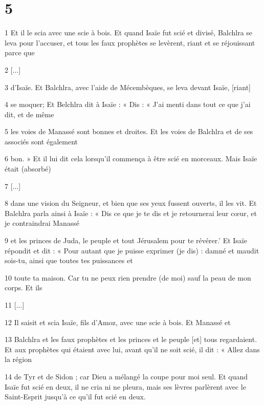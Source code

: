 \chapter{5}

\par 1 Et il le scia avec une scie à bois. Et quand Isaïe fut scié et divisé, Balchlra se leva pour l'accuser, et tous les faux prophètes se levèrent, riant et se réjouissant parce que

\par 2 [...]

\par 3 d’Isaïe. Et Balchlra, avec l'aide de Mécembèques, se leva devant Isaïe, [riant]

\par 4 se moquer; Et Belchlra dit à Isaïe : « Dis : « J'ai menti dans tout ce que j'ai dit, et de même

\par 5 les voies de Manassé sont bonnes et droites. Et les voies de Balchlra et de ses associés sont également

\par 6 bon. » Et il lui dit cela lorsqu'il commença à être scié en morceaux. Mais Isaïe était (absorbé)

\par 7 [...]

\par 8 dans une vision du Seigneur, et bien que ses yeux fussent ouverts, il les vit. Et Balchlra parla ainsi à Isaïe : « Dis ce que je te dis et je retournerai leur cœur, et je contraindrai Manassé

\par 9 et les princes de Juda, le peuple et tout Jérusalem pour te révérer.' Et Isaïe répondit et dit : « Pour autant que je puisse exprimer (je dis) : damné et maudit sois-tu, ainsi que toutes tes puissances et

\par 10 toute ta maison. Car tu ne peux rien prendre (de moi) sauf la peau de mon corps. Et ils

\par 11 [...]

\par 12 Il saisit et scia Isaïe, fils d'Amoz, avec une scie à bois. Et Manassé et

\par 13 Balchlra et les faux prophètes et les princes et le peuple [et] tous regardaient. Et aux prophètes qui étaient avec lui, avant qu'il ne soit scié, il dit : « Allez dans la région

\par 14 de Tyr et de Sidon ; car Dieu a mélangé la coupe pour moi seul. Et quand Isaïe fut scié en deux, il ne cria ni ne pleura, mais ses lèvres parlèrent avec le Saint-Esprit jusqu'à ce qu'il fut scié en deux.

